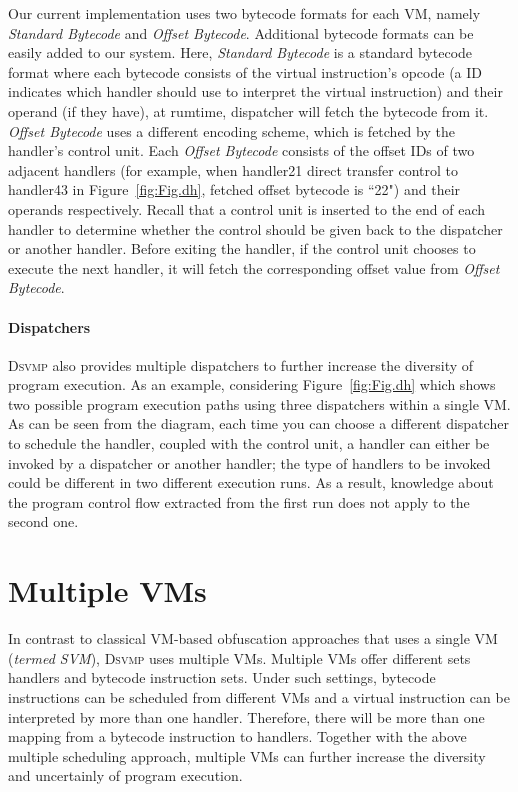 \documentclass[preprint,12pt,3p]{elsarticle}
\newcommand{\DSVMP}{\textsc{Dsvmp}\xspace}
\begin{document}
Our current implementation uses two bytecode formats for each VM, namely \emph{Standard Bytecode} and
\emph{Offset Bytecode}. Additional bytecode formats can be easily added to our system. Here, \emph{Standard Bytecode} is a
standard bytecode format where each bytecode consists of the virtual instruction's opcode (a ID indicates which handler
should use to interpret the virtual instruction) and their operand (if they have), at rumtime, dispatcher will fetch the bytecode from it. \emph{Offset Bytecode} uses a different encoding scheme, which is fetched by the handler's control unit.
Each \emph{Offset Bytecode} consists of the offset IDs of two adjacent handlers (for example, when handler21 direct transfer control to handler43 in Figure~\ref{fig:Fig.dh}, fetched offset bytecode is ``22") and their operands respectively.
Recall that a control unit is inserted to the end of each handler to determine whether the control should be
given back to the dispatcher or another handler.  Before exiting the handler, if the control unit chooses to execute
the next handler, it will fetch the corresponding offset value from \emph{Offset Bytecode}.

\paragraph{Dispatchers} \DSVMP also provides multiple dispatchers to further increase the diversity of program execution.
As an example, considering Figure~\ref{fig:Fig.dh} which shows two possible program execution paths using
three dispatchers within a single VM. As can be seen from the diagram,
each time you can choose a different dispatcher to schedule the handler,
coupled with the control unit, a handler can either be invoked by a dispatcher or another handler;
the type of handlers to be invoked could be different in two different execution runs.
As a result, knowledge about the program control flow extracted from the first run does not apply to the second one.


\section{Multiple VMs}\label{sec:mvm}
In contrast to classical VM-based obfuscation approaches that uses a single VM (\emph{termed SVM}), \DSVMP uses multiple VMs.
Multiple VMs offer different sets handlers and bytecode instruction sets. Under such settings,
bytecode instructions can be scheduled from different VMs and a virtual instruction can be interpreted by more than one handler.
Therefore, there will be more than one mapping from a bytecode instruction to handlers.
Together with the above multiple scheduling approach, multiple VMs can further increase the diversity and uncertainly of program execution.
\end{document}

